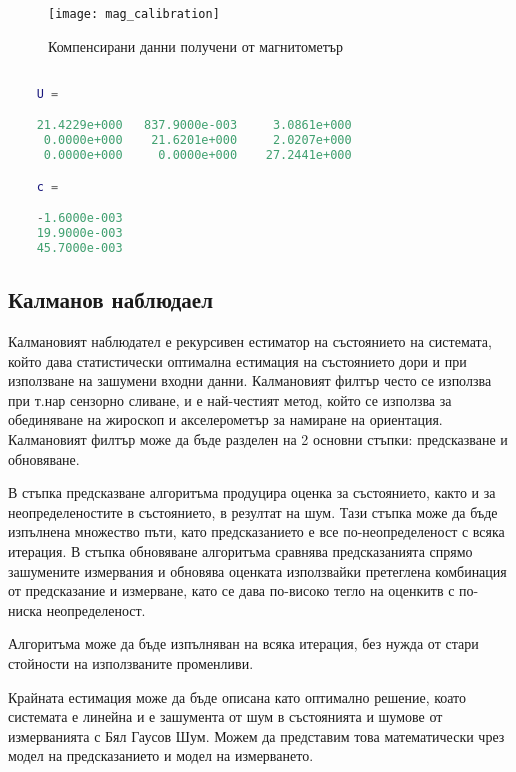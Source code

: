 \begin{figure}[htpb!]
    \centering
    \texttt{[image: mag\_calibration]}
    \caption{Компенсирани данни получени от магнитометър}
    \label{fig:mag_calibration}
\end{figure}

\begin{lstlisting}[language=matlab, caption={Получени трансформация елипсоид-сфера и отместване на център}, label={lst:mag_cal_trans}]

    U =

    21.4229e+000   837.9000e-003     3.0861e+000
     0.0000e+000    21.6201e+000     2.0207e+000
     0.0000e+000     0.0000e+000    27.2441e+000

    c =

    -1.6000e-003
    19.9000e-003
    45.7000e-003

\end{lstlisting}


\subsection{Калманов наблюдаел}

Калмановият наблюдател е рекурсивен естиматор на 
състоянието на системата, който дава статистически
оптимална естимация на състоянието дори и при използване на
зашумени входни данни.
Калмановият филтър често се използва при т.нар сензорно сливане,
и е най-честият метод, който се използва 
за обединяване на жироскоп и акселерометър за намиране на ориентация.
Калмановият филтър може да бъде разделен на 2 основни стъпки: предсказване и обновяване.

В стъпка предсказване алгоритъма продуцира оценка за състоянието, както и за неопределеностите в състоянието,
в резултат на шум. Тази стъпка може да бъде изпълнена множество пъти, като предсказанието е все по-неопределеност с всяка итерация.
В стъпка обновяване алгоритъма сравнява предсказанията спрямо зашумените измервания и обновява
оценката използвайки претеглена комбинация 
от предсказание и измерване, като се дава по-високо
тегло на оценкитв с по-ниска неопределеност.

Алгоритъма може да бъде изпълняван на всяка итерация,
без нужда от стари стойности на използваните променливи.

Крайната естимация може да бъде описана като оптимално решение,
коато системата е линейна и е зашумента от шум в състоянията и шумове от измерванията с Бял Гаусов Шум.
Можем да представим това математически чрез модел на предсказанието 
и модел на измерването.

